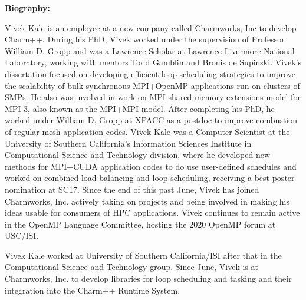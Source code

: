 \documentclass{article}
\title{}
\author{}
\date{}
\begin{document}
\underline{\bf Biography:} 

Vivek Kale is an employee at a new company called Charmworks, Inc to
develop Charm++. During his PhD, Vivek worked under the supervision of
Professor William D. Gropp and was a Lawrence Scholar at Lawrence Livermore
National Laboratory, working with mentors Todd Gamblin and Bronis de
Supinski. Vivek's dissertation focused on developing efficient
loop scheduling strategies to improve the scalability of
bulk-synchronous MPI+OpenMP applications run on clusters of SMPs. He
also was involved in work on MPI shared memory extensions model for
MPI-3, also known as the MPI+MPI model. After completing his PhD, he
worked under William D. Gropp at XPACC as a postdoc to improve
combustion of regular mesh application codes.
Vivek Kale was a Computer Scientist at the University
of Southern California's Information Sciences Institute in
Computational Science and Technology division, where he developed new
methods for MPI+CUDA application codes to do use user-defined
schedules and worked on combined load balancing and loop scheduling,
receiving a best poster nomination at SC17. Since the end of this past
June, Vivek has joined Charmworks, Inc. actively taking on projects
and being involved in making his ideas usable for consumers of HPC
applications. Vivek continues to remain active in the OpenMP Language
Committee, hosting the 2020 OpenMP forum at USC/ISI.


 


% 
Vivek Kale worked at University of Southern California/ISI after that
in the Computational Science and Technology group. Since June, Vivek
is at Charmworks, Inc. to develop libraries for loop scheduling and
tasking and their integration into the Charm++ Runtime System.
\end{document}

